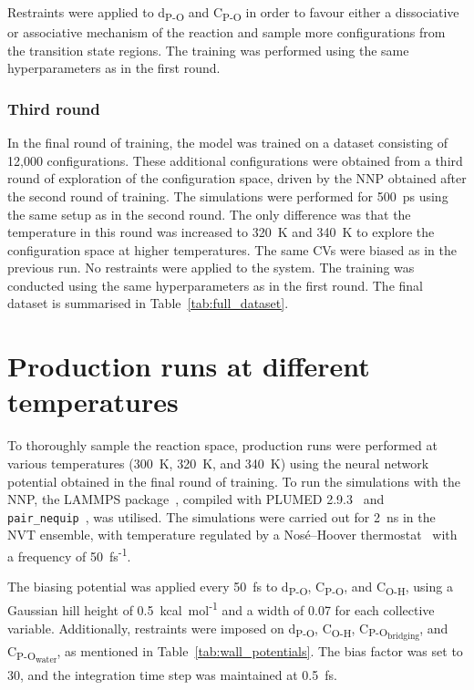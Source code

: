 Restraints were applied to d\textsubscript{P-O} and C\textsubscript{P-O} in order to favour either a dissociative or associative mechanism of the reaction and sample more configurations from the transition state regions. The training was performed using the same hyperparameters as in the first round.



\subsubsection{Third round}
In the final round of training, the model was trained on a dataset consisting of 12,000 configurations. These additional configurations were obtained from a third round of exploration of the configuration space, driven by the NNP obtained after the second round of training. The simulations were performed for 500~ps using the same setup as in the second round. The only difference was that the temperature in this round was increased to 320~K and 340~K to explore the configuration space at higher temperatures. The same CVs were biased as in the previous run. No restraints were applied to the system. The training was conducted using the same hyperparameters as in the first round. The final dataset is summarised in Table~\ref{tab:full_dataset}.




\section{Production runs at different temperatures}
To thoroughly sample the reaction space, production runs were performed at various temperatures (300~K, 320~K, and 340~K) using the neural network potential obtained in the final round of training. To run the simulations with the NNP, the LAMMPS package~\citep{thompsonLAMMPSFlexibleSimulation2022}, compiled with PLUMED 2.9.3~\citep{tribelloPLUMED2New2014} and \texttt{pair\_nequip}~\citep{MirgroupPair_nequip}, was utilised. The simulations were carried out for 2~ns in the NVT ensemble, with temperature regulated by a Nos\'e--Hoover thermostat~\citep{noseUnifiedFormulationConstant1984, hooverCanonicalDynamicsEquilibrium1985} with a frequency of 50~fs\textsuperscript{-1}.

The biasing potential was applied every 50~fs to d\textsubscript{P-O}, C\textsubscript{P-O}, and C\textsubscript{O-H}, using a Gaussian hill height of 0.5~kcal~mol\textsuperscript{-1} and a width of 0.07 for each collective variable. Additionally, restraints were imposed on d\textsubscript{P-O}, C\textsubscript{O-H}, C\textsubscript{P-O\textsubscript{bridging}}, and C\textsubscript{P-O\textsubscript{water}}, as mentioned in Table~\ref{tab:wall_potentials}. The bias factor was set to 30, and the integration time step was maintained at 0.5~fs.

